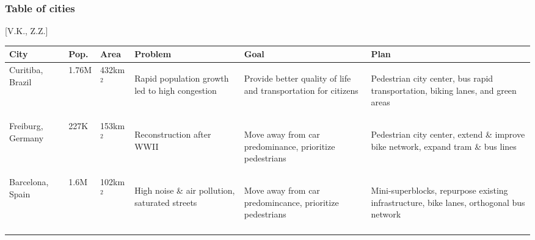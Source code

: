 \documentclass[12pt]{article}                       %
\begin{document}
\newpage
\subsubsection{Table of cities}[V.K., Z.Z.]
\begin{table}[H]
    \centering
    \singlespacing
    \small
    \begin{tabular}{ m{1.7cm} | m{1.1cm} | m{1.3cm} | m{3.4cm} | m{3.4cm} | m{3.4cm} }
        \textbf{City} & \textbf{Pop.} & \textbf{Area} & \textbf{Problem} & \textbf{Goal} & \textbf{Plan} \\
        \hline{}
        Curitiba, Brazil &
        1.76M &
        432km$^2$ &
        \begin{flushleft}Rapid population growth led to high congestion \end{flushleft} &
        \begin{flushleft}Provide better quality of life and transportation for citizens\end{flushleft} &
        \begin{flushleft}Pedestrian city center, bus rapid transportation, biking lanes, and green areas\end{flushleft} \\ 
        \hline{}
        
        Freiburg, Germany &
        227K &
        153km$^2$ &
        \begin{flushleft}Reconstruction after WWII \end{flushleft} &
        \begin{flushleft}Move away from car predominance, prioritize pedestrians\end{flushleft} &
        \begin{flushleft}Pedestrian city center, extend \& improve bike network, expand tram \& bus lines\end{flushleft} \\
        \hline{}
        
        Barcelona, Spain &
        1.6M &
        102km$^2$ &
        \begin{flushleft}High noise \& air pollution, saturated streets\end{flushleft} &
        \begin{flushleft}Move away from car predomincance, prioritize pedestrians\end{flushleft} &
        \begin{flushleft}Mini-superblocks, repurpose existing infrastructure, bike lanes, orthogonal bus network\end{flushleft} \\
        \hline{}
        

\end{tabular}
\end{table}
\end{document}

